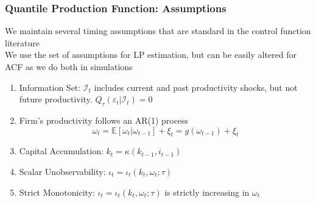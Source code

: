 \documentclass{beamer}
\begin{document}
\begin{frame}
\frametitle{Quantile Production Function: Assumptions}
We maintain several timing assumptions that are standard in the control function literature\\

We use the set of assumptions for LP estimation, but can be easily altered for ACF as we do both in simulations\\
\pause

\begin{enumerate}
	\item Information Set: $\mathcal{I}_{t}$ includes current and past productivity shocks, but not future productivity. $Q_{\tau}(\varepsilon_{t}|\mathcal{I}_{t})=0$
	\item Firm's productivity follows an AR(1) process
	\begin{equation}
		\omega_{t}=\mathbb{E}[\omega_{t}|\omega_{t-1}]+\xi_{t}=g(\omega_{t-1})+\xi_{t}
	\end{equation}
	\item Capital Accumulation: $k_{t}=\kappa(k_{t-1}, i_{t-1})$
	\item Scalar Unobservability: $\iota_{t}=\iota_{t}(k_{t}, \omega_{t};\tau)$
	\item Strict Monotonicity: $\iota_{t}=\iota_{t}(k_{t}, \omega_{t};\tau)$ is strictly increasing in $\omega_{t}$
\end{enumerate}
\end{frame}

\end{document}
